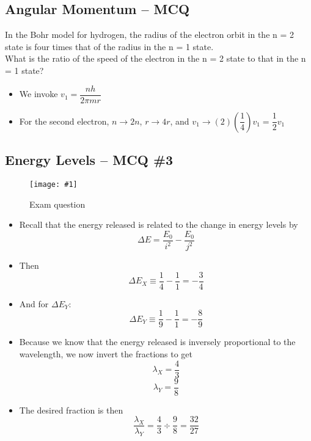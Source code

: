 \documentclass[a4paper,12pt]{article}
\newcommand{\img}[4]{\begin{center}
  \begin{figure}[H]
    \centering
    \texttt{[image: \#1]}
    \caption{#3}
    \label{fig:#4}
  \end{figure}
\end{center}}
\begin{document}
\pagebreak

\subsection{Angular Momentum -- MCQ}

In the Bohr model for hydrogen, the radius of the electron orbit in the n = 2 state is four times that of the radius in the n = 1 state.\\
What is the ratio of the speed of the electron in the n = 2 state to that in the n = 1 state?

\begin{itemize}
  \item We invoke $v_1 = \dfrac{nh}{2\pi mr}$
  \item For the second electron, $n\to 2n$, $r\to 4r$, and $v_1\to (2)(\dfrac{1}{4})v_1 = \dfrac{1}{2}v_1$
\end{itemize}

\pagebreak

\subsection{Energy Levels -- MCQ \#3}

\img{ex/4.png}{0.8}{Exam question}{ex4}
\begin{itemize}
  \item Recall that the energy released is related to the change in energy levels by
        $$\Delta E = \frac{E_0}{i^2} - \frac{E_0}{j^2}$$
  \item Then
        $$\Delta E_X \equiv \frac{1}{4} - \frac{1}{1} = -\frac{3}{4}$$
  \item And for $\Delta E_Y$:
        $$\Delta E_Y \equiv \frac{1}{9} - \frac{1}{1} = -\frac{8}{9}$$
  \item Because we know that the energy released is inversely proportional to the wavelength, we now invert the fractions to get
        $$\lambda_X = \frac{4}{3}$$
        $$\lambda_Y = \frac{9}{8}$$
  \item The desired fraction is then
        $$\frac{\lambda_X}{\lambda_Y} = \frac{4}{3} \div \frac{9}{8} = \frac{32}{27}$$
\end{itemize}
\end{document}

